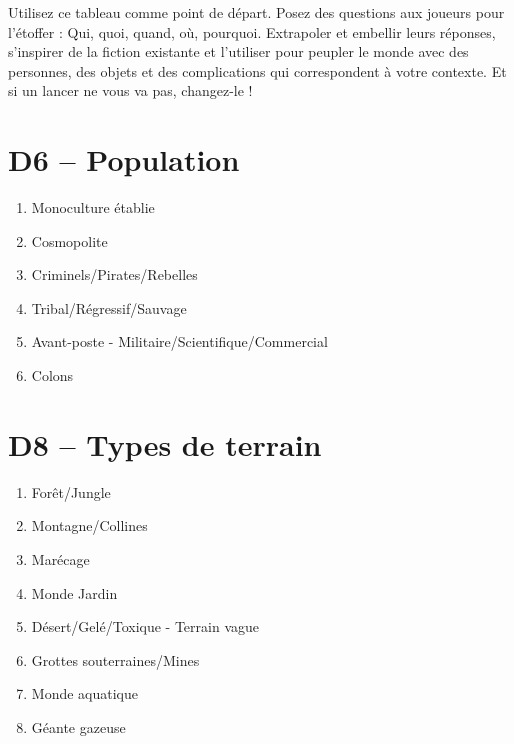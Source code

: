 \documentclass{article}
\begin{document}
\title{\vspace{-0.5cm}{\Huge One-Roll Planets} \vspace{-1cm}}

\date{}

\maketitle

Utilisez ce tableau comme point de départ. Posez des questions aux joueurs pour l'étoffer : Qui, quoi, quand, où, pourquoi. Extrapoler et embellir leurs réponses, s'inspirer de la fiction existante et l'utiliser pour peupler le monde avec des personnes, des objets et des complications qui correspondent à votre contexte. Et si un lancer ne vous va pas, changez-le !


\begin{multicols}{2}
	\section*{D6 -- Population}
	\begin{enumerate}
		\item Monoculture établie
		\item Cosmopolite 
		\item Criminels/Pirates/Rebelles
		\item Tribal/Régressif/Sauvage
		\item Avant-poste - Militaire/Scientifique/Commercial
		\item Colons
	\end{enumerate}
	\section*{D8 -- Types de terrain}
	\begin{enumerate}
		\item Forêt/Jungle
		\item Montagne/Collines
		\item Marécage
		\item Monde Jardin
		\item Désert/Gelé/Toxique - Terrain vague
		\item Grottes souterraines/Mines
		\item Monde aquatique
		\item Géante gazeuse
	\end{enumerate}

\end{multicols}
\end{document}

